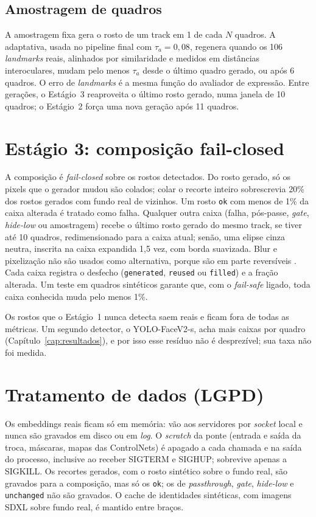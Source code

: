 \subsection{Amostragem de quadros}

A amostragem fixa gera o rosto de um track em 1 de cada $N$ quadros. A adaptativa, usada no pipeline final com $\tau_a = 0{,}08$, regenera quando os 106 \emph{landmarks} reais, alinhados por similaridade e medidos em distâncias interoculares, mudam pelo menos $\tau_a$ desde o último quadro gerado, ou após 6 quadros. O erro de \emph{landmarks} é a mesma função do avaliador de expressão. Entre gerações, o Estágio~3 reaproveita o último rosto gerado, numa janela de 10 quadros; o Estágio~2 força uma nova geração após 11 quadros.

\section{Estágio 3: composição fail-closed}

A composição é \emph{fail-closed} sobre os rostos detectados. Do rosto gerado, só os pixels que o gerador mudou são colados; colar o recorte inteiro sobrescrevia 20\% dos rostos gerados com fundo real de vizinhos. Um rosto \texttt{ok} com menos de 1\% da caixa alterada é tratado como falha. Qualquer outra caixa (falha, pós-passe, \emph{gate}, \emph{hide-low} ou amostragem) recebe o último rosto gerado do mesmo track, se tiver até 10 quadros, redimensionado para a caixa atual; senão, uma elipse cinza neutra, inscrita na caixa expandida 1,5 vez, com borda suavizada. Blur e pixelização não são usados como alternativa, porque são em parte reversíveis \citep{fantomas}. Cada caixa registra o desfecho (\texttt{generated}, \texttt{reused} ou \texttt{filled}) e a fração alterada. Um teste em quadros sintéticos garante que, com o \emph{fail-safe} ligado, toda caixa conhecida muda pelo menos 1\%.

Os rostos que o Estágio~1 nunca detecta saem reais e ficam fora de todas as métricas. Um segundo detector, o YOLO-FaceV2-s, acha mais caixas por quadro (Capítulo~\ref{cap:resultados}), e por isso esse resíduo não é desprezível; sua taxa não foi medida.

\section{Tratamento de dados (LGPD)}

Os embeddings reais ficam só em memória: vão aos servidores por \emph{socket} local e nunca são gravados em disco ou em \emph{log}. O \emph{scratch} da ponte (entrada e saída da troca, máscaras, mapas das ControlNets) é apagado a cada chamada e na saída do processo, inclusive ao receber SIGTERM e SIGHUP; sobrevive apenas a SIGKILL. Os recortes gerados, com o rosto sintético sobre o fundo real, são gravados para a composição, mas só os \texttt{ok}; os de \emph{passthrough}, \emph{gate}, \emph{hide-low} e \texttt{unchanged} não são gravados. O cache de identidades sintéticas, com imagens SDXL sobre fundo real, é mantido entre braços.

